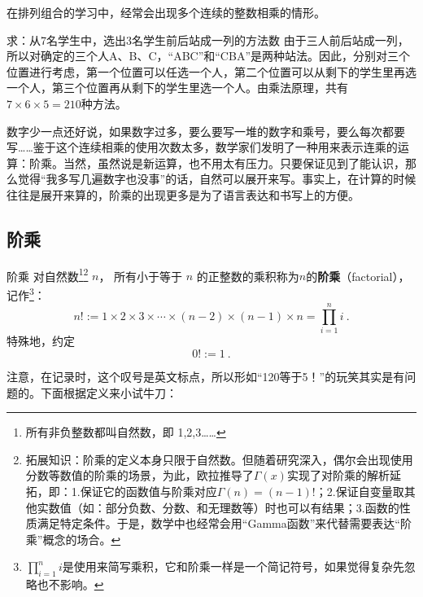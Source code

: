 

在排列组合的学习中，经常会出现多个连续的整数相乘的情形。

\begin{example}{求：从7名学生中，选出3名学生前后站成一列的方法数}\label{ex_factor_1}
由于三人前后站成一列，所以对确定的三个人A、B、C，“ABC”和“CBA”是两种站法。因此，分别对三个位置进行考虑，第一个位置可以任选一个人，第二个位置可以从剩下的学生里再选一个人，第三个位置再从剩下的学生里选一个人。由乘法原理，共有$7\times6\times5=210$种方法。
\end{example}

数字少一点还好说，如果数字过多，要么要写一堆的数字和乘号，要么每次都要写……鉴于这个连续相乘的使用次数太多，数学家们发明了一种用来表示连乘的运算：阶乘。当然，虽然说是新运算，也不用太有压力。只要保证见到了能认识，那么觉得“我多写几遍数字也没事”的话，自然可以展开来写。事实上，在计算的时候往往是展开来算的，阶乘的出现更多是为了语言表达和书写上的方便。

\subsection{阶乘}

\begin{definition}{阶乘}
对自然数\footnote{所有非负整数都叫自然数，即 1,2,3……}\footnote{拓展知识：阶乘的定义本身只限于自然数。但随着研究深入，偶尔会出现使用分数等数值的阶乘的场景，为此，欧拉推导了$\Gamma(x)$实现了对阶乘的解析延拓，即：1.保证它的函数值与阶乘对应$\Gamma(n)=(n-1)!$；2.保证自变量取其他实数值（如：部分负数、分数、和无理数等）时也可以有结果；3.函数的性质满足特定条件。于是，数学中也经常会用“Gamma函数”来代替需要表达“阶乘”概念的场合。} $n$， 所有小于等于 $n$ 的正整数的乘积称为$n$的\textbf{阶乘}（factorial），记作\footnote{$\prod_{i = 1}^n i$是使用来简写乘积，它和阶乘一样是一个简记符号，如果觉得复杂先忽略也不影响。}：
\begin{equation}
n! := 1 \times 2 \times 3 \times \cdots \times(n - 2)\times(n - 1)\times n=\prod_{i = 1}^n i ~.
\end{equation}
特殊地，约定
\begin{equation}
0! := 1~.
\end{equation}
\end{definition}

注意，在记录时，这个叹号是英文标点，所以形如“120等于5！”的玩笑其实是有问题的。下面根据定义来小试牛刀：


